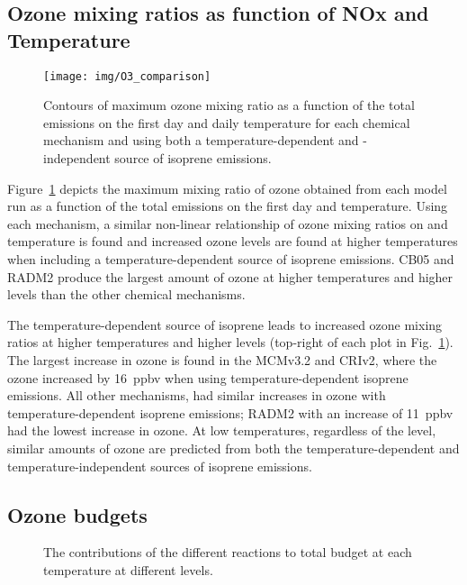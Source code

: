 \subsection{Ozone mixing ratios as function of NOx and Temperature} \label{ss:r_contours}

\begin{figure}%
    \centering%
    \caption{Contours of maximum ozone mixing ratio as a function of the total  emissions on the first day and daily temperature for each chemical mechanism and using both a temperature-dependent and -independent source of isoprene emissions.}
    \label{f:ozone_contours}%
    \texttt{[image: img/O3\_comparison]}
\end{figure}

Figure~\ref{f:ozone_contours} depicts the maximum mixing ratio of ozone obtained from each model run as a function of the total  emissions on the first day and temperature.
Using each mechanism, a similar non-linear relationship of ozone mixing ratios on  and temperature is found and increased ozone levels are found at higher temperatures when including a temperature-dependent source of isoprene emissions.
CB05 and RADM2 produce the largest amount of ozone at higher temperatures and higher  levels than the other chemical mechanisms.

The temperature-dependent source of isoprene leads to increased ozone mixing ratios at higher temperatures and higher  levels (top-right of each plot in Fig.~\ref{f:ozone_contours}).
The largest increase in ozone is found in the MCMv3.2 and CRIv2, where the ozone increased by 16~ppbv when using temperature-dependent isoprene emissions.
All other mechanisms, had similar increases in ozone with temperature-dependent isoprene emissions; RADM2 with an increase of 11~ppbv had the lowest increase in ozone.
At low temperatures, regardless of the  level, similar amounts of ozone are predicted from both the temperature-dependent and temperature-independent sources of isoprene emissions.

\subsection{Ozone budgets} \label{ss:r_budgets}

\begin{figure}%
    \centering%
    \caption{The contributions of the different reactions to total  budget at each temperature at different  levels.}%
    \label{f:ozone_budgets}%
\end{figure}

